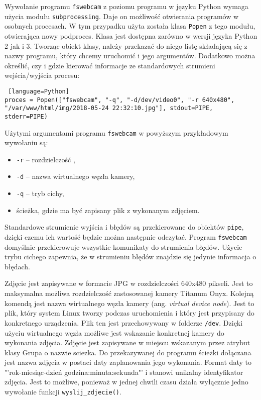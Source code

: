 \documentclass[a4paper,11pt,twoside]{article}
\begin{document}
Wywołanie programu \texttt{fswebcam} z poziomu programu w języku Python wymaga użycia modułu \texttt{subprocessing}. Daje on możliwość otwierania programów w osobnych procesach. W tym przypadku użyta została klasa \texttt{Popen} z tego modułu, otwierająca nowy podproces. Klasa jest dostępna zarówno w wersji języka Python 2 jak i 3. Tworząc obiekt klasy, należy przekazać do niego listę składającą się z nazwy programu, który chcemy uruchomić i jego argumentów. Dodatkowo można określić, czy i gdzie kierować informacje ze standardowych strumieni wejścia/wyjścia procesu:

\begin{lstlisting} [language=Python]
proces = Popen(["fswebcam", "-q", "-d/dev/video0", "-r 640x480", "/var/www/html/img/2018-05-24 22:32:10.jpg"], stdout=PIPE, stderr=PIPE)
\end{lstlisting}

Użytymi argumentami programu \texttt{fswebcam} w powyższym przykładowym wywołaniu są:
\begin{itemize}
\item \texttt{-r} -- rozdzielczość , 
\item \texttt{-d} -- nazwa wirtualnego węzła kamery,
\item \texttt{-q} -- tryb cichy,
\item ścieżka, gdzie ma być zapisany plik z wykonanym zdjęciem.
\end{itemize}
Standardowe strumienie wyjścia i błędów są przekierowane do obiektów \texttt{pipe}, dzięki czemu ich wartość będzie można następnie odczytać. Program \texttt{fswebcam} domyślnie przekierowuje wszystkie komunikaty do strumienia błędów. Użycie trybu cichego zapewnia, że w strumieniu błędów znajdzie się jedynie informacja o błędach.

Zdjęcie jest zapisywane w formacie JPG w rozdzielczości 640x480 pikseli. Jest to maksymalna możliwa rozdzielczość zastosowanej kamery Titanum Onyx. Kolejną komendą jest nazwa wirtualnego węzła kamery (ang. \textit{virtual device node}). Jest to plik, który system Linux tworzy podczas uruchomienia i który jest przypisany do konkretnego urządzenia. Plik ten jest przechowywany w folderze \texttt{/dev}. Dzięki użyciu wirtualnego węzła możliwe jest wskazanie konkretnej kamery do wykonania zdjęcia. Zdjęcie jest zapisywane w miejscu wskazanym przez atrybut klasy Grupa o nazwie sciezka. Do przekazywanej do programu ścieżki dołączana jest nazwa zdjęcia w postaci daty zaplanowania jego wykonania. Format daty to "'rok-miesiąc-dzień godzina:minuta:sekunda"' i stanowi unikalny identyfikator zdjęcia. Jest to możliwe, ponieważ w jednej chwili czasu działa wyłącznie jedno wywołanie funkcji \texttt{wyslij{\_}zdjecie()}.
\end{document}
